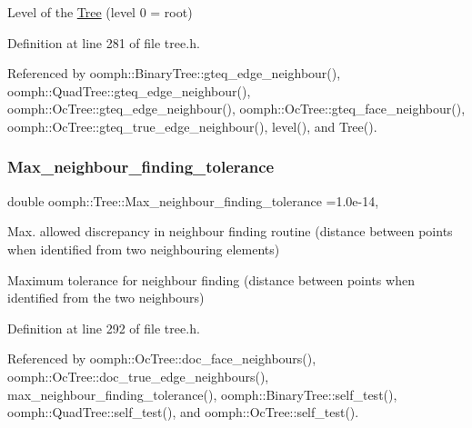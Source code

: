 Level of the \hyperlink{classoomph_1_1Tree}{Tree} (level 0 = root) 



Definition at line 281 of file tree.\+h.



Referenced by oomph\+::\+Binary\+Tree\+::gteq\+\_\+edge\+\_\+neighbour(), oomph\+::\+Quad\+Tree\+::gteq\+\_\+edge\+\_\+neighbour(), oomph\+::\+Oc\+Tree\+::gteq\+\_\+edge\+\_\+neighbour(), oomph\+::\+Oc\+Tree\+::gteq\+\_\+face\+\_\+neighbour(), oomph\+::\+Oc\+Tree\+::gteq\+\_\+true\+\_\+edge\+\_\+neighbour(), level(), and Tree().

\mbox{\label{classoomph_1_1Tree_aef9abebc166fa3bf81ecb59ec0d5d6b2}} 
\subsubsection{\texorpdfstring{Max\+\_\+neighbour\+\_\+finding\+\_\+tolerance}{Max\_neighbour\_finding\_tolerance}}
{\footnotesize\ttfamily double oomph\+::\+Tree\+::\+Max\+\_\+neighbour\+\_\+finding\+\_\+tolerance =1.\+0e-\/14\hspace{0.3cm}{\ttfamily [static]}, {\ttfamily [protected]}}



Max. allowed discrepancy in neighbour finding routine (distance between points when identified from two neighbouring elements) 

Maximum tolerance for neighbour finding (distance between points when identified from the two neighbours) 

Definition at line 292 of file tree.\+h.



Referenced by oomph\+::\+Oc\+Tree\+::doc\+\_\+face\+\_\+neighbours(), oomph\+::\+Oc\+Tree\+::doc\+\_\+true\+\_\+edge\+\_\+neighbours(), max\+\_\+neighbour\+\_\+finding\+\_\+tolerance(), oomph\+::\+Binary\+Tree\+::self\+\_\+test(), oomph\+::\+Quad\+Tree\+::self\+\_\+test(), and oomph\+::\+Oc\+Tree\+::self\+\_\+test().

\mbox{\label{classoomph_1_1Tree_a61ee20b575da510512d0e108cf7b06c6}} 
